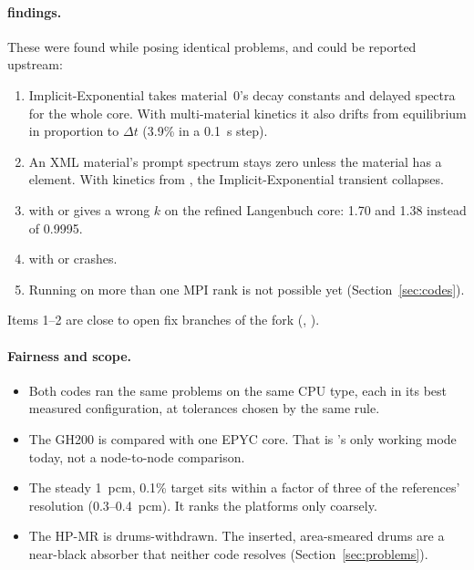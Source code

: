 \paragraph{\ffn{} findings.} These were found while posing identical problems,
and could be reported upstream:
\begin{enumerate}
\item Implicit-Exponential takes material~0's decay constants and delayed
  spectra for the whole core. With multi-material kinetics it also drifts
  from equilibrium in proportion to $\Delta t$ (3.9\% in a 0.1~s step).
\item An XML material's prompt spectrum stays zero unless the material has a
   element. With kinetics from , the
  Implicit-Exponential transient collapses.
\item {} with  or  gives a wrong $k$ on
  the refined Langenbuch core: 1.70 and 1.38 instead of 0.9995.
\item {} with  or  crashes.
\item Running on more than one MPI rank is not possible yet
  (Section~\ref{sec:codes}).
\end{enumerate}
Items 1--2 are close to open fix branches of the  fork
(,
).

\paragraph{Fairness and scope.}
\begin{itemize}
\item Both codes ran the same problems on the same CPU type, each in its best
  measured configuration, at tolerances chosen by the same rule.
\item The GH200 is compared with one EPYC core. That is \ffn's only working
  mode today, not a node-to-node comparison.
\item The steady 1~pcm, 0.1\% target sits within a factor of three of the
  references' resolution (0.3--0.4~pcm). It ranks the platforms only coarsely.
\item The HP-MR is drums-withdrawn. The inserted, area-smeared drums are a
  near-black absorber that neither code resolves (Section~\ref{sec:problems}).
\end{itemize}
